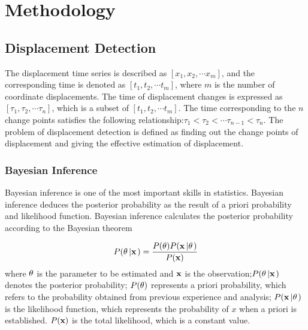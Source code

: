 \documentclass{svjour3}                     %
\begin{document}


\section{Methodology}
\label{method}





\subsection{Displacement Detection}
The displacement time series is described as $\left[ {{x_1},{x_2}, \cdots {x_m}} \right]$,  and the corresponding time is denoted as $\left[ {{t_1},{t_2}, \cdots {t_m}} \right]$, where $m$ is the number of coordinate displacements. The time of displacement changes is expressed as $\left[ {{\tau _1},{\tau _2}, \cdots {\tau _n}} \right]$, which is a subset of $\left[ {{t_1},{t_2}, \cdots {t_m}} \right]$.  
The time corresponding to the $n$ change points satisfies the following relationship:$ {{\tau _1}<{\tau _2}<\cdots {\tau _{n-1}}<{\tau _n}} $.
The problem of displacement detection is defined as finding out the change points of displacement and giving the effective estimation of displacement.

\subsubsection{Bayesian Inference}
Bayesian inference is one of the most important skills in statistics. Bayesian inference deduces the posterior probability as the result of a priori probability and likelihood function. Bayesian inference calculates the posterior probability according to the Bayesian theorem

\begin{equation}\label{eq_bayesian_inference}
P({\bf{\theta }}\left| {\bf{x}} \right.) = \frac{{P({\bf{\theta }})P({\bf{x}}\left| {\bf{\theta }} \right.)}}{{P({\bf{x}})}}
\end{equation}
where $\bf{\theta }$ is the parameter to be estimated and $\bf{x}$ is the observation;$P({\bf{\theta }}\left| {\bf{x}} \right.)$ denotes the posterior probability; $P({\bf{\theta }})$ represents a priori probability, which refers to the probability obtained from previous experience and analysis;
$P({\bf{x}}\left| {\bf{\theta }} \right.)$ is the likelihood function, which represents the probability of $x$ when a priori is established. ${P({\bf{x}})}$ is the total likelihood, which is a constant value.
\end{document}
